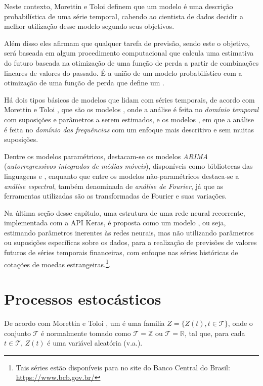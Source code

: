Neste contexto, Morettin e Toloi \citep{morettin} definem que um modelo é uma descrição probabilística de uma série temporal, cabendo ao cientista de dados decidir a melhor utilização desse modelo segundo seus objetivos. 

Além disso eles afirmam que qualquer tarefa de previsão, sendo este o objetivo, será baseada em algum procedimento computacional que calcula uma estimativa do futuro baseada na otimização de uma função de perda a partir de combinações lineares de valores do passado. É a união de um modelo probabilístico com a otimização de uma função de perda que define um .

Há dois tipos básicos de modelos que lidam com séries temporais, de acordo com Morettin e Toloi \citep{morettin}, que são os modelos , onde a análise é feita no \emph{domínio temporal} com suposições e parâmetros a serem estimados, e os modelos , em que a análise é feita no \emph{domínio das frequências} com um enfoque mais descritivo e sem muitas suposições.

Dentre os modelos paramétricos, destacam-se os modelos \emph{ARIMA} (\emph{autorregressivos integrados de médias móveis}), disponíveis como bibliotecas das linguagens  e , enquanto que entre os modelos não-paramétricos destaca-se a \emph{análise espectral}, também denominada de \emph{análise de Fourier}, já que as ferramentas utilizadas são as transformadas de Fourier e suas variações.

Na última seção desse capítulo, uma estrutura de uma rede neural recorrente, implementada com a API Keras, é proposta como um modelo , ou seja, estimando parâmetros inerentes às redes neurais, mas não utilizando parâmetros ou suposições específicas sobre os dados, para a realização de previsões de valores futuros de séries temporais financeiras, com enfoque nas séries históricas de cotações de moedas estrangeiras.\footnote{Tais séries estão disponíveis para  no site do Banco Central do Brasil: \url{https://www.bcb.gov.br/}}.

\section{Processos estocásticos}

De acordo com Morettin e Toloi \citep{morettin}, um  é uma familia $Z = \{ Z(t), t \in \mathcal{T} \}$, onde o conjunto $\mathcal{T}$ é normalmente tomado como $\mathcal{T} = \mathbb{Z}$ ou $\mathcal{T} = \mathbb{R}$, tal que, para cada $t \in \mathcal{T}$, $Z(t)$ é uma variável aleatória (v.a.). 

